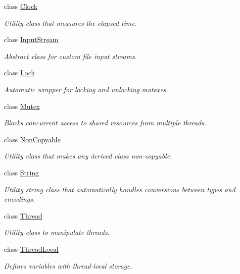 \begin{DoxyCompactItemize}
class \hyperlink{classsf_1_1_clock}{Clock}
\begin{DoxyCompactList}\small\item\em Utility class that measures the elapsed time. \end{DoxyCompactList}\item 
class \hyperlink{classsf_1_1_input_stream}{Input\-Stream}
\begin{DoxyCompactList}\small\item\em Abstract class for custom file input streams. \end{DoxyCompactList}\item 
class \hyperlink{classsf_1_1_lock}{Lock}
\begin{DoxyCompactList}\small\item\em Automatic wrapper for locking and unlocking mutexes. \end{DoxyCompactList}\item 
class \hyperlink{classsf_1_1_mutex}{Mutex}
\begin{DoxyCompactList}\small\item\em Blocks concurrent access to shared resources from multiple threads. \end{DoxyCompactList}\item 
class \hyperlink{classsf_1_1_non_copyable}{Non\-Copyable}
\begin{DoxyCompactList}\small\item\em Utility class that makes any derived class non-\/copyable. \end{DoxyCompactList}\item 
class \hyperlink{classsf_1_1_string}{String}
\begin{DoxyCompactList}\small\item\em Utility string class that automatically handles conversions between types and encodings. \end{DoxyCompactList}\item 
class \hyperlink{classsf_1_1_thread}{Thread}
\begin{DoxyCompactList}\small\item\em Utility class to manipulate threads. \end{DoxyCompactList}\item 
class \hyperlink{classsf_1_1_thread_local}{Thread\-Local}
\begin{DoxyCompactList}\small\item\em Defines variables with thread-\/local storage. \end{DoxyCompactList}\item 

\end{DoxyCompactItemize}
